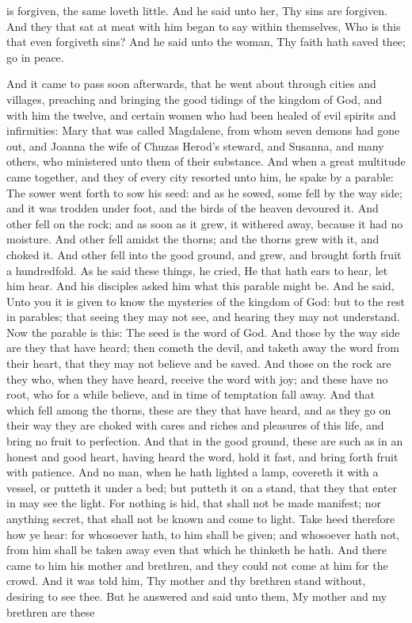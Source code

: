 is forgiven, the same loveth little. And he said unto her, Thy sins are forgiven. And they that sat at meat with him began to say within themselves, Who is this that even forgiveth sins? And he said unto the woman, Thy faith hath saved thee; go in peace. 

And it came to pass soon afterwards, that he went about through cities and villages, preaching and bringing the good tidings of the kingdom of God, and with him the twelve, and certain women who had been healed of evil spirits and infirmities: Mary that was called Magdalene, from whom seven demons had gone out, and Joanna the wife of Chuzas Herod’s steward, and Susanna, and many others, who ministered unto them of their substance.  And when a great multitude came together, and they of every city resorted unto him, he spake by a parable: The sower went forth to sow his seed: and as he sowed, some fell by the way side; and it was trodden under foot, and the birds of the heaven devoured it. And other fell on the rock; and as soon as it grew, it withered away, because it had no moisture. And other fell amidst the thorns; and the thorns grew with it, and choked it. And other fell into the good ground, and grew, and brought forth fruit a hundredfold. As he said these things, he cried, He that hath ears to hear, let him hear.  And his disciples asked him what this parable might be. And he said, Unto you it is given to know the mysteries of the kingdom of God: but to the rest in parables; that seeing they may not see, and hearing they may not understand. Now the parable is this: The seed is the word of God. And those by the way side are they that have heard; then cometh the devil, and taketh away the word from their heart, that they may not believe and be saved. And those on the rock are they who, when they have heard, receive the word with joy; and these have no root, who for a while believe, and in time of temptation fall away. And that which fell among the thorns, these are they that have heard, and as they go on their way they are choked with cares and riches and pleasures of this life, and bring no fruit to perfection. And that in the good ground, these are such as in an honest and good heart, having heard the word, hold it fast, and bring forth fruit with patience.  And no man, when he hath lighted a lamp, covereth it with a vessel, or putteth it under a bed; but putteth it on a stand, that they that enter in may see the light. For nothing is hid, that shall not be made manifest; nor anything secret, that shall not be known and come to light. Take heed therefore how ye hear: for whosoever hath, to him shall be given; and whosoever hath not, from him shall be taken away even that which he thinketh he hath.  And there came to him his mother and brethren, and they could not come at him for the crowd. And it was told him, Thy mother and thy brethren stand without, desiring to see thee. But he answered and said unto them, My mother and my brethren are these 